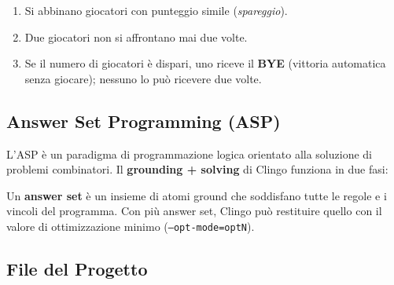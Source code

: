 \documentclass[12pt,a4paper]{article}
\begin{document}
\begin{enumerate}[noitemsep]
  \item Si abbinano giocatori con punteggio simile (\emph{spareggio}).
  \item Due giocatori non si affrontano mai due volte.
  \item Se il numero di giocatori è dispari, uno riceve il \textbf{BYE}
        (vittoria automatica senza giocare); nessuno lo può ricevere due volte.
\end{enumerate}

\subsection{Answer Set Programming (ASP)}

L'ASP è un paradigma di programmazione logica orientato alla soluzione di
problemi combinatori. Il \textbf{grounding + solving} di Clingo funziona in due fasi:

\begin{center}
\end{center}

Un \textbf{answer set} è un insieme di atomi ground che soddisfano tutte le
regole e i vincoli del programma. Con più answer set, Clingo può restituire
quello con il valore di ottimizzazione minimo (\texttt{--opt-mode=optN}).

\subsection{File del Progetto}
\end{document}
